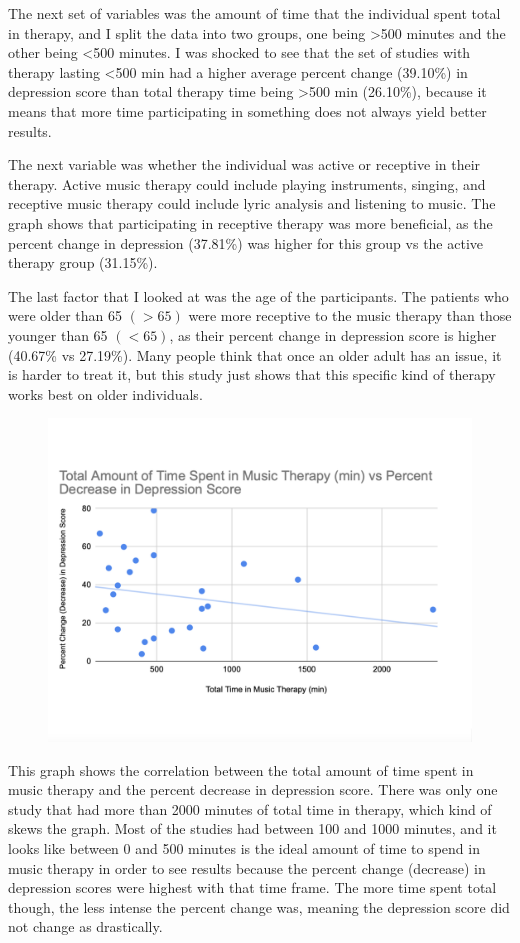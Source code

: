 \documentclass[12pt]{article}
\begin{document}
 The next set of variables was the amount of time that the individual spent total in therapy, and I split the data into two groups, one being >500 minutes and the other being <500 minutes. I was shocked to see that the set of studies with therapy lasting <500 min had a higher average percent change (39.10\%) in depression score than total therapy time being >500 min (26.10\%), because it means that more time participating in something does not always yield better results. 
 
 The next variable was whether the individual was active or receptive in their therapy. Active music therapy could include playing instruments, singing, and receptive music therapy could include lyric analysis and listening to music. The graph shows that participating in receptive therapy was more beneficial, as the percent change in depression (37.81\%) was higher  for this group vs the active therapy group (31.15\%). 
 
 The last factor that I looked at was the age of the participants. The patients who were older than 65 $(>65)$ were more receptive to the music therapy than those younger than 65 $(<65)$, as their percent change in depression score is higher (40.67\% vs 27.19\%). Many people think that once an older adult has an issue, it is harder to treat it, but this study just shows that this specific kind of therapy works best on older individuals.

 \begin{figure}[hbt!]
  \centering
  \includegraphics[width=12 cm]{CHART3.png}
  \label{fig:chart3}
\end{figure}

 This graph shows the correlation between the total amount of time spent in music therapy and the percent decrease in depression score. There was only one study that had more than 2000 minutes of total time in therapy, which kind of skews the graph. Most of the studies had between 100 and 1000 minutes, and it looks like between 0 and 500 minutes is the ideal amount of time to spend in music therapy in order to see results because the percent change (decrease) in depression scores were highest with that time frame. The more time spent total though, the less intense the percent change was, meaning the depression score did not change as drastically. 
\end{document}
